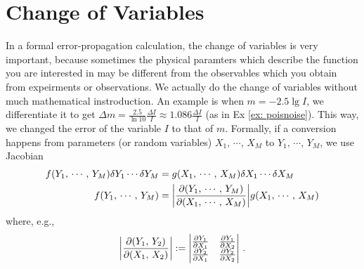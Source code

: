 \section{Change of Variables}
In a formal error-propagation calculation, the change of variables is very important, because sometimes the physical paramters which describe the function you are interested in may be different from the observables which you obtain from expeirments or observations. We actually do the change of variables without much mathematical instroduction. An example is when $ m = -2.5 \lg I $, we differentiate it to get $ \Delta m = \frac{2.5}{\ln 10} \frac{\Delta I}{I} \approx 1.086 \frac{\Delta I}{I}$ (as in Ex \ref{ex: poisnoise}). This way, we changed the error of the variable $ I $ to that of $ m $. Formally, if a conversion happens from parameters (or random variables) $ X_1,\,\cdots,\, X_M $ to $ Y_1,\,\cdots,\, Y_M $, we use Jacobian
\begin{equation}\label{eq: change_of_var}
\begin{aligned}
  f(Y_1,\,\cdots,\, Y_M) \delta Y_1 \cdots \delta Y_M 
    &= g(X_1,\,\cdots,\, X_M) \delta X_1 \cdots \delta X_M 
  \\
  f(Y_1,\,\cdots,\, Y_M) 
    &= \qty| \pdv{(Y_1,\,\cdots,\, Y_M)}{(X_1,\,\cdots,\, X_M)} | g(X_1,\,\cdots,\, X_M)
\end{aligned}
\end{equation}
where, e.g., 
\begin{equation}\label{eq: jacobian}
  \qty| \pdv{(Y_1,\, Y_2)}{(X_1,\, X_2)} | :=
  \mqty| \pdv{Y_1}{X_1} & \pdv{Y_1}{X_2} \\ \pdv{Y_2}{X_1} & \pdv{Y_2}{X_2} | ~.
\end{equation}

